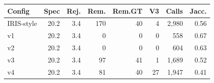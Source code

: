 \begin{tabular}{@{}lrrrrrrr@{}}
\toprule
Config & Spec & Rej. & Rem. & Rem.GT & V3 & Calls & Jacc. \\
\midrule
IRIS-style & 20.2 & 3.4 & 170 & 40 & 4 & 2,980 & 0.56 \\
v1 & 20.2 & 3.4 & 0 & 0 & 0 & 558 & 0.67 \\
v2 & 20.2 & 3.4 & 0 & 0 & 0 & 604 & 0.63 \\
v3 & 20.2 & 3.4 & 97 & 41 & 1 & 1,689 & 0.52 \\
v4 & 20.2 & 3.4 & 81 & 40 & 27 & 1,947 & 0.41 \\
\bottomrule
\end{tabular}
